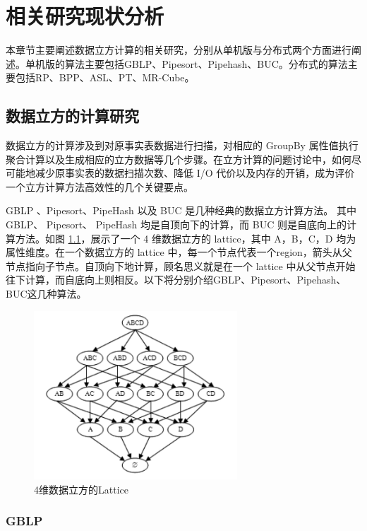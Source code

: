 \chapter{相关研究现状分析}

本章节主要阐述数据立方计算的相关研究，分别从单机版与分布式两个方面进行阐述。单机版的算法主要包括GBLP、Pipesort、Pipehash、BUC。分布式的算法主要包括RP、BPP、ASL、PT、MR-Cube。

\section{数据立方的计算研究}

数据立方的计算涉及到对原事实表数据进行扫描，对相应的 GroupBy 属性值执行聚合计算以及生成相应的立方数据等几个步骤。在立方计算的问题讨论中，如何尽可能地减少原事实表的数据扫描次数、降低 I/O 代价以及内存的开销，成为评价一个立方计算方法高效性的几个关键要点。

GBLP \cite{gray1997data}、Pipesort、PipeHash \cite{agarwal1996computation} 以及 BUC \cite{beyer1999bottom} 是几种经典的数据立方计算方法。 其中GBLP、 Pipesort、 PipeHash 均是自顶向下的计算，而 BUC 则是自底向上的计算方法。如图 \ref{4_dimension_lattice}，展示了一个 4 维数据立方的 lattice，其中 A，B，C，D 均为属性维度。在一个数据立方的 lattice 中，每一个节点代表一个region，箭头从父节点指向子节点。自顶向下地计算，顾名思义就是在一个 lattice 中从父节点开始往下计算，而自底向上则相反。以下将分别介绍GBLP、Pipesort、Pipehash、BUC这几种算法。


\begin{figure}[!htb]
\centering\includegraphics[width=3in]{picture/ch_current_research/4_dimension_lattice} 
\caption{4维数据立方的Lattice}\label{4_dimension_lattice} 
\end{figure} 

\subsection{GBLP}

